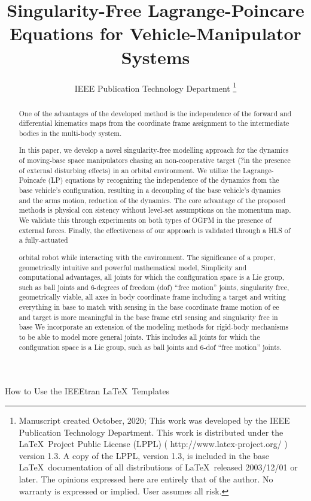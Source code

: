 \documentclass[lettersize,journal]{IEEEtran}
\begin{document}
\title{Singularity-Free Lagrange-Poincare Equations for Vehicle-Manipulator Systems}
\author{IEEE Publication Technology Department
\thanks{Manuscript created October, 2020; This work was developed by the IEEE Publication Technology Department. This work is distributed under the \LaTeX \ Project Public License (LPPL) ( http://www.latex-project.org/ ) version 1.3. A copy of the LPPL, version 1.3, is included in the base \LaTeX \ documentation of all distributions of \LaTeX \ released 2003/12/01 or later. The opinions expressed here are entirely that of the author. No warranty is expressed or implied. User assumes all risk.}}

%
{How to Use the IEEEtran \LaTeX \ Templates}

\maketitle

\begin{abstract}
One of the advantages of the developed method is the independence of the forward and differential kinematics maps from the coordinate frame assignment to the intermediate bodies in the multi-body system.


In this paper, we develop a novel singularity-free modelling approach for the dynamics of moving-base space manipulators chasing an non-cooperative target (?in the presence of external disturbing effects) in an orbital environment. We utilize the Lagrange-Poincaŕe (LP) equations by recognizing the independence of the dynamics from the base vehicle's configuration, resulting in a decoupling of the base vehicle's dynamics and the arms motion, reduction of the dynamics.%
The core advantage of the proposed methods is physical con
sistency without level-set assumptions on the momentum map.
We validate this through experiments on both types of OGFM
in the presence of external forces. Finally, the effectiveness of
our approach is validated through a HLS of a fully-actuated

orbital robot while interacting with the environment.
The significance of a proper, geometrically intuitive and powerful mathematical model, Simplicity and computational advantages,
all joints for which the configuration space is a Lie group, such as ball joints and 6-degrees of freedom (dof) “free motion” joints, singularity free,
geometrically viable, all axes in body coordinate frame
including a target and writing everything in base to match with sensing in the base coordinate frame
motion of ee and target is more meaningful in the base frame
ctrl sensing and singularity free in base
We incorporate an extension of the modeling methods for rigid-body mechanisms to be able to model more general joints.
This includes all joints for which the configuration space is a Lie group, such as ball joints and 6-dof “free
motion” joints.
\end{abstract}
\end{document}
